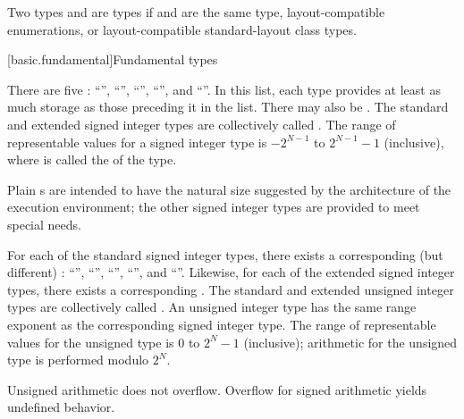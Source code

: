 \pnum
{}%
Two types   and   are
 types
if  and  are the same type,
layout-compatible enumerations, or
layout-compatible standard-layout class types.

[basic.fundamental]{Fundamental types}

\pnum
{}%
%
There are five  :
%
%
%
%
%
``'', ``'', ``'',
``'', and ``''. In
this list, each type provides at least as much storage as those
preceding it in the list.
%
%
There may also be 
.
The standard and extended signed integer types are collectively called
.
The range of representable values for a signed integer type is
$-2^{N-1}$ to $2^{N-1}-1$ (inclusive),
where  is called the  of the type.
%
\begin{note}
Plain s are intended to have
the natural size suggested by the architecture of the execution environment;
the other signed integer types are provided to meet special needs.
\end{note}

\pnum
{}%
%
For each of the standard signed integer types,
there exists a corresponding (but different)
%
:
%
%
%
%
%
``'', ``'',
``'', ``'', and
``''.
%
Likewise, for each of the extended signed integer types,
there exists a corresponding .
The standard and extended unsigned integer types
are collectively called .
An unsigned integer type has the same range exponent 
as the corresponding signed integer type.
%
The range of representable values for the unsigned type is
$0$ to $2^N-1$ (inclusive);
arithmetic for the unsigned type is performed modulo $2^N$.
\begin{note}
Unsigned arithmetic does not overflow.
Overflow for signed arithmetic yields undefined behavior.
\end{note}

